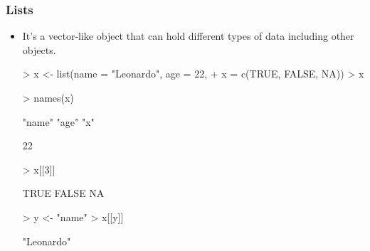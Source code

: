 \begin{frame}
  \frametitle{Lists}
  \begin{itemize}
  \item It's a vector-like object that can hold different types of data including other  objects.
\begin{Schunk}
\begin{Sinput}
> x <- list(name = "Leonardo", age = 22, 
+     x = c(TRUE, FALSE, NA))
> x
\end{Sinput}
\begin{Sinput}
> names(x)
\end{Sinput}
\begin{Soutput}
[1] "name" "age"  "x"   
\end{Soutput}
\begin{Soutput}
[1] 22
\end{Soutput}
\begin{Sinput}
> x[[3]]
\end{Sinput}
\begin{Soutput}
[1]  TRUE FALSE    NA
\end{Soutput}
\begin{Sinput}
> y <- "name"
> x[[y]]
\end{Sinput}
\begin{Soutput}
[1] "Leonardo"
\end{Soutput}
\end{Schunk}
  \end{itemize}
\end{frame}

